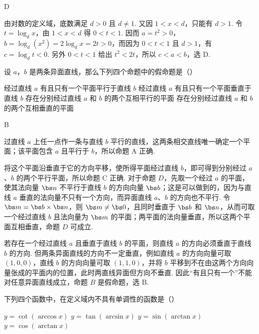 \documentclass[UTF8,a4paper,oneside,11pt]{ctexbook}
\begin{document}
\begin{answer}
D
\end{answer}

\begin{solution}
由对数的定义域，底数满足 \(d>0\) 且 \(d\ne1\). 又因 \(1<x<d\)，只能有 \(d>1\). 令 \(t=\log_d x\)，由 \(1<x<d\) 得 \(0<t<1\). 因而
\(a=t^2>0\)，\(b=\log_d\left(x^2\right)=2\log_d x=2t>0\)，而因为 \(0<t<1\) 且 \(d>1\)，有 \(c=\log_d t<0\). 另外 \(0<t<1\) 给出 \(t^2<2t\)，所以 \(c<a<b\)，选 D.
\end{solution}

\begin{problem}
设 \(a\)，\(b\) 是两条异面直线，那么下列四个命题中的假命题是（\quad）

\choices
    {经过直线 \(a\) 有且只有一个平面平行于直线 \(b\)}
    {经过直线 \(a\) 有且只有一个平面垂直于直线 \(b\)}
    {存在分别经过直线 \(a\) 和 \(b\) 的两个互相平行的平面}
    {存在分别经过直线 \(a\) 和 \(b\) 的两个互相垂直的平面}
\end{problem}

\begin{answer}
B
\end{answer}

\begin{solution}
过直线 \(a\) 上任一点作一条与直线 \(b\) 平行的直线，这两条相交直线唯一确定一个平面；该平面包含 \(a\) 且平行于 \(b\)，所以命题 A 正确.

将这个平面沿垂直于它的方向平移，使所得平面经过直线 \(b\)，即可得到分别经过 \(a\)、\(b\) 的两个平行平面，所以命题 C 正确. 对于命题 \(D\)，先取一个经过 \(a\) 的平面，使其法向量 \(\bs n\) 不平行于直线 \(b\) 的方向向量 \(\bs b\)；这是可以做到的，因为与直线 \(a\) 垂直的法向量不只有一个方向，而异面直线 \(a\)、\(b\) 的方向也不平行. 令 \(\bs m=\bs b\times\bs n\)，则 \(\bs m\ne\bs 0\)，且同时垂直于 \(\bs b\) 和 \(\bs n\)，从而可取一个经过直线 \(b\) 且法向量为 \(\bs m\) 的平面；两平面的法向量垂直，所以这两个平面互相垂直，命题 \(D\) 可成立.

若存在一个经过直线 \(a\) 且垂直于直线 \(b\) 的平面，则直线 \(a\) 的方向必须垂直于直线 \(b\) 的方向. 但两条异面直线的方向不一定垂直，例如直线 \(a\) 的方向向量可取 \((1,0,0)\)，直线 \(b\) 的方向向量可取 \((1,1,0)\)，并将 \(b\) 平移到不在由这两个方向向量张成的平面内的位置，此时两直线异面但方向不垂直. 因此“有且只有一个”不能对任意异面直线成立，命题 \(B\) 是假命题，选 B.
\end{solution}

\begin{problem}
下列四个函数中，在定义域内不具有单调性的函数是（\quad）

\choices
    {\(y=\cot\left(\arccos x\right)\)}
    {\(y=\tan\left(\arcsin x\right)\)}
    {\(y=\sin\left(\arctan x\right)\)}
    {\(y=\cos\left(\arctan x\right)\)}
\end{problem}
\end{document}
